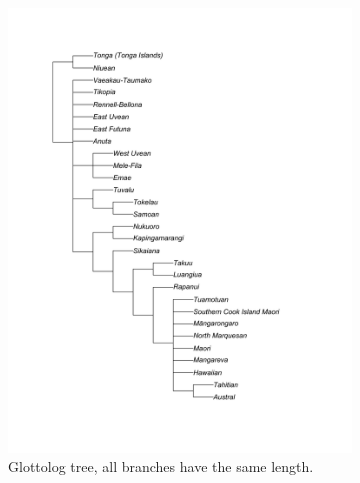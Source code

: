 \documentclass[12pt,letterpaper]{article}
\begin{document}
\begin{figure}[ht]
\centering
    \begin{subfigure}{0.5\linewidth}
      \includegraphics[width=\textwidth]{illustrations/plots_from_R/tree_plots/poly_tree_example_brlen_glottolog_1}
    \caption{Glottolog tree, all branches have the same length.}
    \label{glottolog_example_poly_1}
    \end{subfigure}
\hfil
    \begin{subfigure}{0.5\linewidth}

\end{subfigure}
\end{figure}
\end{document}

